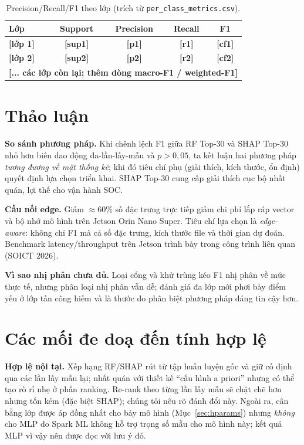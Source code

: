 \documentclass[runningheads]{llncs}
\newcommand{\ph}[1]{{\color{red}\textbf{[#1]}}}
\begin{document}
\begin{table}[htbp]
  \caption{Precision/Recall/F1 theo lớp (trích từ \texttt{per\_class\_metrics.csv}).}
  \label{tab:perclass}
  \centering
  \begin{tabular}{lcccc}
    \toprule
    Lớp & Support & Precision & Recall & F1 \\
    \midrule
    \ph{lớp 1} & \ph{sup1} & \ph{p1} & \ph{r1} & \ph{cf1} \\
    \ph{lớp 2} & \ph{sup2} & \ph{p2} & \ph{r2} & \ph{cf2} \\
    \multicolumn{5}{c}{\ph{... các lớp còn lại; thêm dòng macro-F1 / weighted-F1}} \\
    \bottomrule
  \end{tabular}
\end{table}

\section{Thảo luận}
\label{sec:discuss}

\textbf{So sánh phương pháp.} Khi chênh lệch F1 giữa RF Top-30 và SHAP Top-30 nhỏ hơn biên dao động đa-lần-lấy-mẫu và $p>0{,}05$, ta kết luận hai phương pháp \emph{tương đương về mặt thống kê}; khi đó tiêu chí phụ (giải thích, kích thước, ổn định) quyết định lựa chọn triển khai. SHAP Top-30 cung cấp giải thích cục bộ nhất quán, lợi thế cho vận hành SOC.

\textbf{Cầu nối edge.} Giảm $\approx$60\% số đặc trưng trực tiếp giảm chi phí lắp ráp vector và bộ nhớ mô hình trên Jetson Orin Nano Super. Tiêu chí lựa chọn là \emph{edge-aware}: không chỉ F1 mà cả số đặc trưng, kích thước file và thời gian dự đoán. Benchmark latency/throughput trên Jetson trình bày trong công trình liên quan (SOICT 2026).

\textbf{Vì sao nhị phân chưa đủ.} Loại cổng và khử trùng kéo F1 nhị phân về mức thực tế, nhưng phân loại nhị phân vẫn dễ; đánh giá đa lớp mới phơi bày điểm yếu ở lớp tấn công hiếm và là thước đo phân biệt phương pháp đáng tin cậy hơn.

\section{Các mối đe doạ đến tính hợp lệ}
\label{sec:threats}

\textbf{Hợp lệ nội tại.} Xếp hạng RF/SHAP rút từ tập huấn luyện gốc và giữ cố định qua các lần lấy mẫu lại; nhất quán với thiết kế ``cấu hình a priori'' nhưng có thể tạo rò rỉ nhẹ ở phần ranking. Re-rank theo từng lần lấy mẫu sẽ chặt chẽ hơn nhưng tốn kém (đặc biệt SHAP); chúng tôi nêu rõ đánh đổi này. Ngoài ra, cân bằng lớp được áp đồng nhất cho bảy mô hình (Mục~\ref{sec:hparams}) nhưng \emph{không} cho MLP do Spark ML không hỗ trợ trọng số mẫu cho mô hình này; kết quả MLP vì vậy nên được đọc với lưu ý đó.
\end{document}
